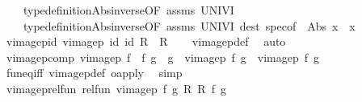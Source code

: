 \begin{isabellebody}
\ \ \ \ type{\isacharunderscore}{\kern0pt}definition{\isachardot}{\kern0pt}Abs{\isacharunderscore}{\kern0pt}inverse{\isacharbrackleft}{\kern0pt}OF\ assms{\isacharparenleft}{\kern0pt}{}{\isacharparenright}{\kern0pt}\ UNIV{\isacharunderscore}{\kern0pt}I{\isacharbrackright}{\kern0pt}\isanewline
\ \ \ \ type{\isacharunderscore}{\kern0pt}definition{\isachardot}{\kern0pt}Abs{\isacharunderscore}{\kern0pt}inverse{\isacharbrackleft}{\kern0pt}OF\ assms{\isacharparenleft}{\kern0pt}{}{\isacharparenright}{\kern0pt}\ UNIV{\isacharunderscore}{\kern0pt}I{\isacharbrackright}{\kern0pt}\ dest{\isacharcolon}{\kern0pt}\ spec{\isacharbrackleft}{\kern0pt}of\ {\isacharunderscore}{\kern0pt}\ {\isachardoublequoteopen}Abs{\isacharprime}{\kern0pt}{\isacharprime}{\kern0pt}\ x{\isachardoublequoteclose}\ \ x{\isacharbrackright}{\kern0pt}{\isacharparenright}{\kern0pt}%
\endisatagproof
{\isafoldproof}%
%
\isadelimproof
\isanewline
%
\endisadelimproof
\isanewline
{}\isamarkupfalse%
\ vimage{}p{\isacharunderscore}{\kern0pt}id{\isacharcolon}{\kern0pt}\ {\isachardoublequoteopen}vimage{}p\ id\ id\ R\ {\isacharequal}{\kern0pt}\ R{\isachardoublequoteclose}\isanewline
%
\isadelimproof
\ \ %
\endisadelimproof
%
\isatagproof
{}\isamarkupfalse%
\ vimage{}p{\isacharunderscore}{\kern0pt}def\ \isamarkupfalse%
\ auto%
\endisatagproof
{\isafoldproof}%
%
\isadelimproof
\isanewline
%
\endisadelimproof
\isanewline
{}\isamarkupfalse%
\ vimage{}p{\isacharunderscore}{\kern0pt}comp{\isacharcolon}{\kern0pt}\ {\isachardoublequoteopen}vimage{}p\ {\isacharparenleft}{\kern0pt}f{}\ {\isasymcirc}\ f{}{\isacharparenright}{\kern0pt}\ {\isacharparenleft}{\kern0pt}g{}\ {\isasymcirc}\ g{}{\isacharparenright}{\kern0pt}\ {\isacharequal}{\kern0pt}\ vimage{}p\ f{}\ g{}\ {\isasymcirc}\ vimage{}p\ f{}\ g{}{\isachardoublequoteclose}\isanewline
%
\isadelimproof
\ \ %
\endisadelimproof
%
\isatagproof
{}\isamarkupfalse%
\ fun{\isacharunderscore}{\kern0pt}eq{\isacharunderscore}{\kern0pt}iff\ vimage{}p{\isacharunderscore}{\kern0pt}def\ o{\isacharunderscore}{\kern0pt}apply\ \isamarkupfalse%
\ simp%
\endisatagproof
{\isafoldproof}%
%
\isadelimproof
\isanewline
%
\endisadelimproof
\isanewline
{}\isamarkupfalse%
\ vimage{}p{\isacharunderscore}{\kern0pt}rel{\isacharunderscore}{\kern0pt}fun{\isacharcolon}{\kern0pt}\ {\isachardoublequoteopen}rel{\isacharunderscore}{\kern0pt}fun\ {\isacharparenleft}{\kern0pt}vimage{}p\ f\ g\ R{\isacharparenright}{\kern0pt}\ R\ f\ g{\isachardoublequoteclose}\isanewline

\end{isabellebody}
